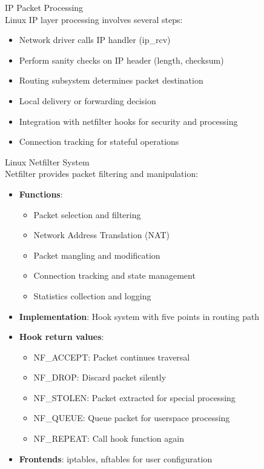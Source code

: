 \begin{concept}{IP Packet Processing}\\
    Linux IP layer processing involves several steps:
    \begin{itemize}
        \item Network driver calls IP handler (ip\_rcv)
        \item Perform sanity checks on IP header (length, checksum)
        \item Routing subsystem determines packet destination
        \item Local delivery or forwarding decision
        \item Integration with netfilter hooks for security and processing
        \item Connection tracking for stateful operations
    \end{itemize}
\end{concept}

\begin{theorem}{Linux Netfilter System}\\
    Netfilter provides packet filtering and manipulation:
    \begin{itemize}
        \item \textbf{Functions}:
            \begin{itemize}
                \item Packet selection and filtering
                \item Network Address Translation (NAT)
                \item Packet mangling and modification
                \item Connection tracking and state management
                \item Statistics collection and logging
            \end{itemize}
        \item \textbf{Implementation}: Hook system with five points in routing path
        \item \textbf{Hook return values}:
            \begin{itemize}
                \item NF\_ACCEPT: Packet continues traversal
                \item NF\_DROP: Discard packet silently
                \item NF\_STOLEN: Packet extracted for special processing
                \item NF\_QUEUE: Queue packet for userspace processing
                \item NF\_REPEAT: Call hook function again
            \end{itemize}
        \item \textbf{Frontends}: iptables, nftables for user configuration
    \end{itemize}
\end{theorem}



